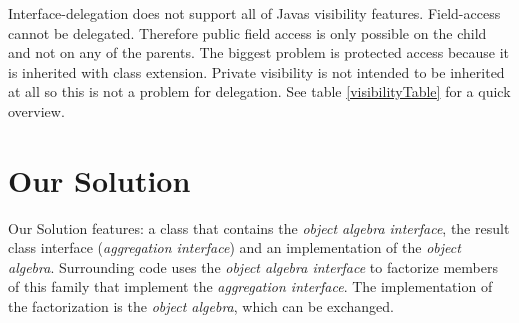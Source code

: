 \documentclass{report}
\begin{document}
\begin{table}
\vspace{-10pt}
\def\arraystretch{1.2}
\setlength\fboxsep{0.6pt}
\centering
{}
\caption{Visibility support for delegation}
\vspace{-10pt}

\label{visibilityTable}
\end{table}

Interface-delegation does not support all of Javas visibility features. Field-access cannot be delegated. Therefore public field access is only possible on the child and not on any of the parents. The biggest problem is protected access because it is inherited with class extension. Private visibility is not intended to be inherited at all so this is not a problem for delegation. See table \ref{visibilityTable} for a quick overview.



\section{Our Solution}

\label{suggestedEPSolution}

Our Solution features: a class that contains the \emph{object algebra interface}, the result class interface (\emph{aggregation interface}) and an implementation of the \emph{object algebra}. Surrounding code uses the \emph{object algebra interface} to factorize members of this family that implement the \emph{aggregation interface}. The implementation of the factorization is the \emph{object algebra}, which can be exchanged.
\end{document}
